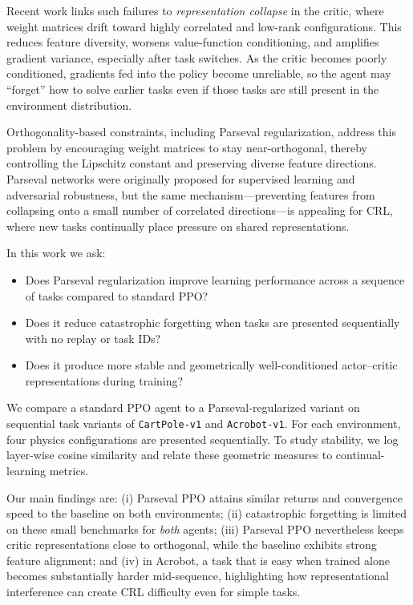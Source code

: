 \documentclass[conference]{IEEEtran}
\begin{document}
Recent work links such failures to \emph{representation collapse} in the critic, where weight matrices drift toward highly correlated and low-rank configurations. This reduces feature diversity, worsens value-function conditioning, and amplifies gradient variance, especially after task switches. As the critic becomes poorly conditioned, gradients fed into the policy become unreliable, so the agent may ``forget'' how to solve earlier tasks even if those tasks are still present in the environment distribution.

Orthogonality-based constraints, including Parseval regularization, address this problem by encouraging weight matrices to stay near-orthogonal, thereby controlling the Lipschitz constant and preserving diverse feature directions. Parseval networks were originally proposed for supervised learning and adversarial robustness, but the same mechanism---preventing features from collapsing onto a small number of correlated directions---is appealing for CRL, where new tasks continually place pressure on shared representations.

In this work we ask:

\begin{itemize}
    \item[RQ1] Does Parseval regularization improve learning performance across a sequence of tasks compared to standard PPO?
    \item[RQ2] Does it reduce catastrophic forgetting when tasks are presented sequentially with no replay or task IDs?
    \item[RQ3] Does it produce more stable and geometrically well-conditioned actor--critic representations during training?
\end{itemize}

We compare a standard PPO agent to a Parseval-regularized variant on sequential task variants of \texttt{CartPole-v1} and \texttt{Acrobot-v1}. For each environment, four physics configurations are presented sequentially. To study stability, we log layer-wise cosine similarity and relate these geometric measures to continual-learning metrics.

Our main findings are: (i) Parseval PPO attains similar returns and convergence speed to the baseline on both environments; (ii) catastrophic forgetting is limited on these small benchmarks for \emph{both} agents; (iii) Parseval PPO nevertheless keeps critic representations close to orthogonal, while the baseline exhibits strong feature alignment; and (iv) in Acrobot, a task that is easy when trained alone becomes substantially harder mid-sequence, highlighting how representational interference can create CRL difficulty even for simple tasks.
\end{document}
